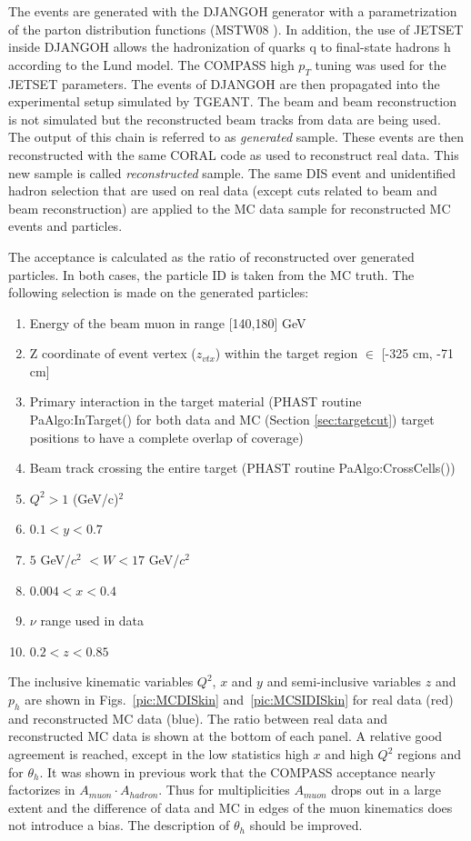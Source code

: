 The events are generated with the DJANGOH generator with a parametrization of the parton distribution functions (MSTW08 \cite{MSTW08}). In addition, the use of JETSET inside DJANGOH allows the hadronization of quarks q to final-state hadrons h according to the Lund model. The COMPASS high $p_T$ tuning was used for the JETSET parameters. The events of DJANGOH are then propagated into the experimental setup simulated by TGEANT. The beam and beam reconstruction is not simulated but the reconstructed beam tracks from data are being used. The output of this chain is referred to as \textit{generated} sample. These events are then reconstructed with the same CORAL code as used to reconstruct real data. This new sample is called \textit{reconstructed} sample. The same DIS event and unidentified hadron selection that are used on real data (except cuts related to beam and beam reconstruction) are applied to the MC data sample for reconstructed MC events and particles.

The acceptance is calculated as the ratio of reconstructed over generated particles. In both cases, the particle ID is taken from the MC truth. The following selection is made on the generated particles:

\begin{enumerate}
  \item Energy of the beam muon in range [140,180] GeV
	\item Z coordinate of event vertex ($z_{vtx}$) within the target region $\in$ [-325 cm, -71 cm]
	\item Primary interaction in the target material (PHAST routine PaAlgo:InTarget() for both data and MC (Section \ref{sec:targetcut}) target positions to have a complete overlap of coverage)
	\item Beam track crossing the entire target (PHAST routine PaAlgo:CrossCells())
  \item $Q^2>1$ (GeV/c)$^2$
  \item $0.1 < y < 0.7$
	\item $5$ GeV/$c^2$ $< W < 17$ GeV/$c^2$
  \item $0.004 < x < 0.4$
  \item $\nu$ range used in data
  \item $0.2 < z < 0.85$
\end{enumerate}

The inclusive kinematic variables $Q^2$, $x$ and $y$ and semi-inclusive variables $z$ and $p_h$ are shown in Figs.~\ref{pic:MCDISkin} and~\ref{pic:MCSIDISkin} for real data (red) and reconstructed MC data (blue). The ratio between real data and reconstructed MC data is shown at the bottom of each panel. A relative good agreement is reached, except in the low statistics high $x$ and high $Q^2$ regions and for $\theta_h$. It was shown in previous work that the COMPASS acceptance nearly factorizes in $A_{muon} \cdot A_{hadron}$. Thus for multiplicities $A_{muon}$ drops out in a large extent and the difference of data and MC in edges of the muon kinematics does not introduce a bias. The description of $\theta_h$ should be improved.

